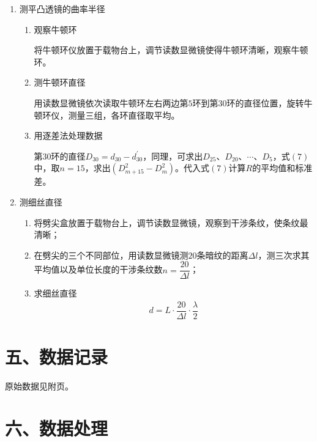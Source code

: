 \documentclass[11pt]{article}
\begin{document}
\begin{enumerate}
    \item 测平凸透镜的曲率半径
    \begin{enumerate}
        \item 观察牛顿环
        
        将牛顿环仪放置于载物台上，调节读数显微镜使得牛顿环清晰，观察牛顿环。
        \item 测牛顿环直径
        
        用读数显微镜依次读取牛顿环左右两边第$5$环到第$30$环的直径位置，旋转牛顿环仪，测量三组，各环直径取平均。
        \item 用逐差法处理数据
        
        第30环的直径$D_{30}=d_{30}-d_{30}^'$，同理，可求出$D_{25}$、$D_{20}$、$\cdots$、$D_5$，式$(7)$中，取$n=15$，求出$(D_{m+15}^2-D_m^2)$。代入式$(7)$计算$R$的平均值和标准差。
    \end{enumerate}
    \item 测细丝直径
    \begin{enumerate}
        \item 将劈尖盒放置于载物台上，调节读数显微镜，观察到干涉条纹，使条纹最清晰；
        \item 在劈尖的三个不同部位，用读数显微镜测$20$条暗纹的距离$\Delta l$，测三次求其平均值以及单位长度的干涉条纹数$n=\dfrac{20}{\Delta l}$；
        \item 求细丝直径
        \begin{align}
            d=L\cdot\dfrac{20}{\Delta l}\cdot\dfrac{\lambda}{2}
        \end{align}
    \end{enumerate}
\end{enumerate}

\section*{五、数据记录}

原始数据见附页。

\section*{六、数据处理}
\end{document}
